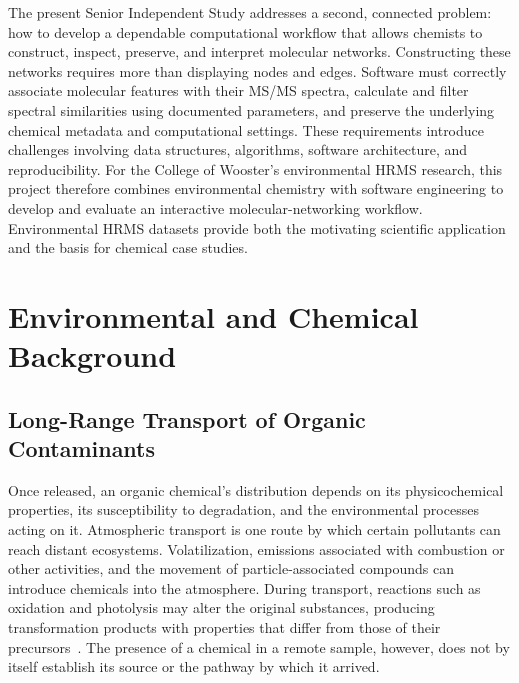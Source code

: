     The present Senior Independent Study addresses a second, connected problem: how to develop a dependable computational workflow that allows chemists to construct, inspect, preserve, and interpret molecular networks. Constructing these networks requires more than displaying nodes and edges. Software must correctly associate molecular features with their MS/MS spectra, calculate and filter spectral similarities using documented parameters, and preserve the underlying chemical metadata and computational settings. These requirements introduce challenges involving data structures, algorithms, software architecture, and reproducibility. For the College of Wooster's environmental HRMS research, this project therefore combines environmental chemistry with software engineering to develop and evaluate an interactive molecular-networking workflow. Environmental HRMS datasets provide both the motivating scientific application and the basis for chemical case studies.

\section{Environmental and Chemical Background}\label{sec:environmental-background}

    \subsection{Long-Range Transport of Organic Contaminants}\label{subsec:long-range-transport}


        Once released, an organic chemical's distribution depends on its physicochemical properties, its susceptibility to degradation, and the environmental processes acting on it. Atmospheric transport is one route by which certain pollutants can reach distant ecosystems. Volatilization, emissions associated with combustion or other activities, and the movement of particle-associated compounds can introduce chemicals into the atmosphere. During transport, reactions such as oxidation and photolysis may alter the original substances, producing transformation products with properties that differ from those of their precursors~\cite{Daly2005,Zahn2024}. The presence of a chemical in a remote sample, however, does not by itself establish its source or the pathway by which it arrived.

